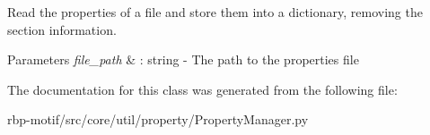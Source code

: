Read the properties of a file and store them into a dictionary, removing the section information. 


\begin{DoxyParams}{Parameters}
{\em file\-\_\-path} & \-: string -\/ The path to the properties file \\
\hline
\end{DoxyParams}


The documentation for this class was generated from the following file\-:\begin{DoxyCompactItemize}
\item 
rbp-\/motif/src/core/util/property/Property\-Manager.\-py\end{DoxyCompactItemize}
